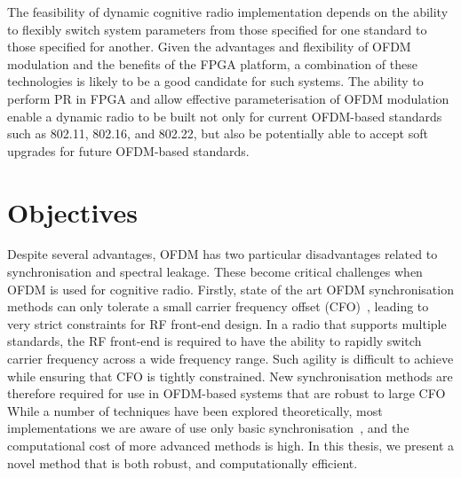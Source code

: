 The feasibility of dynamic cognitive radio implementation depends on the ability to flexibly switch system parameters from those specified for one standard to those specified for another.
Given the advantages and flexibility of OFDM modulation and the benefits of the FPGA platform, a combination of these technologies is likely to be a good candidate for such systems.
The ability to perform PR in FPGA and allow effective parameterisation of OFDM modulation enable a dynamic radio to be built not only for current OFDM-based standards such as 802.11, 802.16, and 802.22, but also be potentially able to accept soft upgrades for future OFDM-based standards.

\section{Objectives}

Despite several advantages, OFDM has two particular disadvantages related to synchronisation and spectral leakage. These become critical challenges when OFDM is used for cognitive radio.
Firstly, state of the art OFDM synchronisation methods can only tolerate a small carrier frequency offset (CFO)~\cite{Kim2008},  leading to very strict constraints for RF front-end design.
In a radio that supports multiple standards, the RF front-end is required to have the ability to rapidly switch carrier frequency across a wide frequency range.
Such agility is difficult to achieve while ensuring that CFO is tightly constrained.
New synchronisation methods are therefore required for use in OFDM-based  systems that are robust to large CFO
While a number of techniques have been explored theoretically, most implementations we are aware of use only basic synchronisation~\cite{Guffey2007,Recio2010}, and the computational cost of more advanced methods is high.
In this thesis, we present a novel method that is both robust, and computationally efficient.

